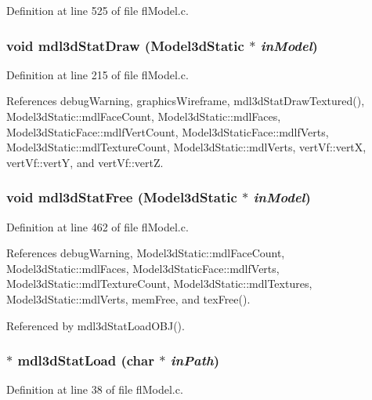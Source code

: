 Definition at line 525 of file fl\-Model.c.
\subsubsection{\setlength{\rightskip}{0pt plus 5cm}void mdl3d\-Stat\-Draw ({\bf Model3d\-Static} $\ast$ {\em in\-Model})}\label{flModel_8h_0438033ad631c43e2df1592edfa1e101}




Definition at line 215 of file fl\-Model.c.

References debug\-Warning, graphics\-Wireframe, mdl3d\-Stat\-Draw\-Textured(), Model3d\-Static::mdl\-Face\-Count, Model3d\-Static::mdl\-Faces, Model3d\-Static\-Face::mdlf\-Vert\-Count, Model3d\-Static\-Face::mdlf\-Verts, Model3d\-Static::mdl\-Texture\-Count, Model3d\-Static::mdl\-Verts, vert\-Vf::vert\-X, vert\-Vf::vert\-Y, and vert\-Vf::vert\-Z.
\subsubsection{\setlength{\rightskip}{0pt plus 5cm}void mdl3d\-Stat\-Free ({\bf Model3d\-Static} $\ast$ {\em in\-Model})}\label{flModel_8h_14a01a131005745a25373e338494dc6e}




Definition at line 462 of file fl\-Model.c.

References debug\-Warning, Model3d\-Static::mdl\-Face\-Count, Model3d\-Static::mdl\-Faces, Model3d\-Static\-Face::mdlf\-Verts, Model3d\-Static::mdl\-Texture\-Count, Model3d\-Static::mdl\-Textures, Model3d\-Static::mdl\-Verts, mem\-Free, and tex\-Free().

Referenced by mdl3d\-Stat\-Load\-OBJ().
\subsubsection{$\ast$ mdl3d\-Stat\-Load (char $\ast$ {\em in\-Path})}\label{flModel_8h_f1d48e04f0daa9248cb6b5fb6488a164}




Definition at line 38 of file fl\-Model.c.

